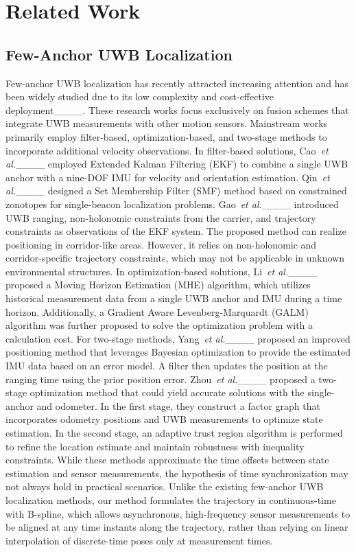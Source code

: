 \section{Related Work}
\subsection{Few-Anchor UWB Localization}
Few-anchor UWB localization has recently attracted increasing attention and has been widely studied due to its low complexity and cost-effective deployment____. 
These research works focus exclusively
on fusion schemes that integrate UWB measurements with other motion sensors. Mainstream works primarily employ filter-based, optimization-based, and two-stage methods to incorporate additional velocity observations. 
In filter-based solutions, Cao~\textit{et al.}____ employed Extended Kalman Filtering (EKF) to combine a single UWB anchor with a nine-DOF IMU for velocity and orientation estimation. Qin~\textit{et al.}____ designed a Set Membership Filter (SMF) method based on constrained zonotopes for single-beacon localization problems. 
Gao~\textit{et al.}____ introduced UWB ranging, non-holonomic constraints from the carrier, and trajectory constraints as observations of the EKF system. The proposed method can realize positioning in corridor-like areas. However, it relies on non-holonomic and corridor-specific trajectory constraints, which may not be applicable in unknown environmental structures. 
In optimization-based solutions, Li~\textit{et al.}____ proposed a Moving Horizon Estimation (MHE) algorithm, which utilizes historical measurement data from a single UWB anchor and IMU during a time horizon. Additionally, a Gradient Aware Levenberg-Marquardt (GALM) algorithm was further proposed to solve the optimization problem with a calculation cost. 
For two-stage methods, Yang~\textit{et al.}____ proposed an improved positioning method that leverages Bayesian optimization to provide the estimated IMU data based on an error model. A filter then updates the position at the ranging time using the prior position error. 
Zhou~\textit{et al.}____ proposed a two-stage optimization method that could yield accurate solutions with the single-anchor and odometer.
In the first stage, they construct a factor graph that incorporates odometry positions and UWB measurements to optimize state estimation. In the second stage, an adaptive trust region algorithm is performed to refine the location estimate and maintain robustness with inequality constraints.  While these methods approximate the time offsets between state estimation and sensor measurements, the hypothesis of time synchronization may not always hold in practical scenarios. Unlike the existing few-anchor UWB localization methods, our method
formulates the trajectory in continuous-time with B-spline, which allows asynchronous, high-frequency sensor measurements to be aligned at any time instants along the trajectory, rather than relying on linear interpolation of discrete-time poses only at measurement times.


